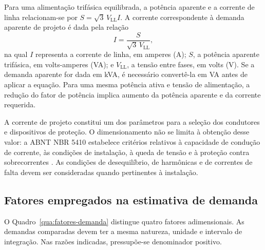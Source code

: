 Para uma alimentação trifásica equilibrada, a potência aparente e a corrente de linha relacionam-se por $S=\sqrt{3}\,V_{\mathrm{LL}}I$. A corrente correspondente à demanda aparente de projeto é dada pela relação
\begin{equation}
 I = \frac{S}{\sqrt{3}\,V_{\mathrm{LL}}},
 \label{eq:corrente-trifasica}
\end{equation}
na qual $I$ representa a corrente de linha, em amperes (A); $S$, a potência aparente trifásica, em volts-amperes (VA); e $V_{\mathrm{LL}}$, a tensão entre fases, em volts (V). Se a demanda aparente for dada em kVA, é necessário convertê-la em VA antes de aplicar a equação. Para uma mesma potência ativa e tensão de alimentação, a redução do fator de potência implica aumento da potência aparente e da corrente requerida.

A corrente de projeto constitui um dos parâmetros para a seleção dos condutores e dispositivos de proteção. O dimensionamento não se limita à obtenção desse valor: a ABNT NBR 5410 estabelece critérios relativos à capacidade de condução de corrente, às condições de instalação, à queda de tensão e à proteção contra sobrecorrentes \cite[itens~5.3, 6.2.5 a~6.2.7]{abnt5410}. As condições de desequilíbrio, de harmônicas e de correntes de falta devem ser consideradas quando pertinentes à instalação.

\subsection{Fatores empregados na estimativa de demanda}

O Quadro~\ref{qua:fatores-demanda} distingue quatro fatores adimensionais. As demandas comparadas devem ter a mesma natureza, unidade e intervalo de integração. Nas razões indicadas, pressupõe-se denominador positivo.

